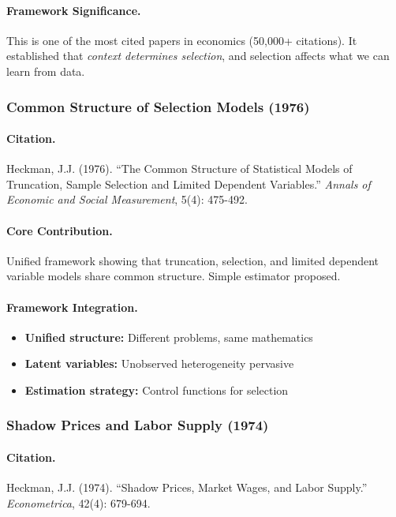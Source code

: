 \paragraph{Framework Significance.}
This is one of the most cited papers in economics (50,000+ citations).
It established that \emph{context determines selection}, and selection
affects what we can learn from data.

\subsubsection{Common Structure of Selection Models (1976)}

\paragraph{Citation.}
Heckman, J.J. (1976). ``The Common Structure of Statistical Models of
Truncation, Sample Selection and Limited Dependent Variables.''
\emph{Annals of Economic and Social Measurement}, 5(4): 475-492.

\paragraph{Core Contribution.}
Unified framework showing that truncation, selection, and limited
dependent variable models share common structure. Simple estimator proposed.

\paragraph{Framework Integration.}
\begin{itemize}
  \item \textbf{Unified structure:} Different problems, same mathematics
  \item \textbf{Latent variables:} Unobserved heterogeneity pervasive
  \item \textbf{Estimation strategy:} Control functions for selection
\end{itemize}

\subsubsection{Shadow Prices and Labor Supply (1974)}

\paragraph{Citation.}
Heckman, J.J. (1974). ``Shadow Prices, Market Wages, and Labor Supply.''
\emph{Econometrica}, 42(4): 679-694.

